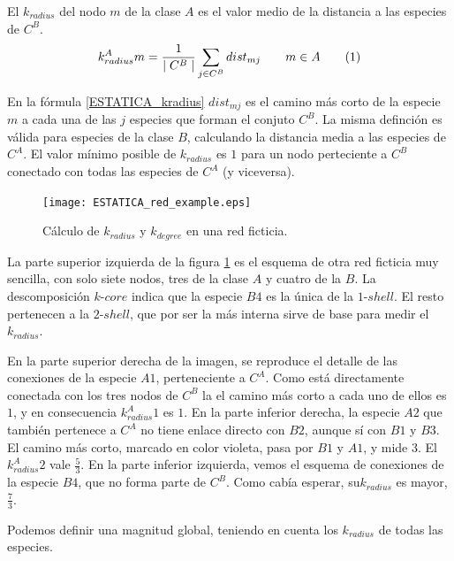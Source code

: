 \begin{theo} 
El \textit{$k_{radius}$} del nodo $m$ de la clase $A$ es el valor medio de la distancia a las especies de $C^B$.
\begin{align*}
\displaystyle
k^A_{radius}m = \frac{1}{\mid C^{B} \mid}\sum\limits_{j \in C^{B}} dist_{mj}  \qquad   m \in A
\stepcounter{equation}\tag{\theequation}\label{kradius}
\end{align*}
\label{ESTATICA_kradius}
\end{theo}

En la fórmula \ref{ESTATICA_kradius} $dist_{mj}$ es el camino más corto de la especie $m$ a cada una de las $j$ especies que forman el conjuto $C^B$. La misma definción es válida para especies de la clase $B$, calculando la distancia media a las especies de $C^A$. El valor mínimo posible de $k_{radius}$ es $1$ para un nodo perteciente a $C^B$ conectado con todas las especies de $C^A$ (y viceversa).

\begin{figure}[h!]
\centering
\texttt{[image: ESTATICA\_red\_example.eps]}
\caption {Cálculo de \textit{$k_{radius}$} y  \textit{$k_{degree}$} en una red ficticia.}
\label{fig:ESTATICA_red_example}
\end{figure}

La parte superior izquierda de la figura \ref{fig:ESTATICA_red_example} es el esquema de otra red ficticia muy sencilla, con solo siete nodos, tres de la clase $A$ y cuatro de la $B$. La descomposición $k$-$core$ indica que la especie $B4$ es la única de la $1$-$shell$. El resto pertenecen a la $2$-$shell$, que por ser la más interna sirve de base para medir el $k_{radius}$. 

En la parte superior derecha de la imagen, se reproduce el detalle de las conexiones de la especie $A1$, perteneciente a $C^{A}$.  Como está directamente conectada con los tres nodos de $C^{B}$ la el camino más corto a cada uno de ellos es $1$, y en consecuencia $k^A_{radius}1$ es $1$. En la parte inferior derecha, la especie $A2$ que también pertenece a $C^{A}$ no tiene enlace directo con $B2$, aunque sí con $B1$ y $B3$. El camino más corto, marcado en color violeta, pasa por $B1$ y $A1$, y mide $3$. El $k^A_{radius}2$ vale $\frac{5}{3}$. En la parte inferior izquierda, vemos el esquema de conexiones de la especie $B4$, que no forma parte de $C^{B}$. Como cabía esperar, su$k_{radius}$ es mayor, $\frac{7}{3}$. 

Podemos definir una magnitud global, teniendo en cuenta los $k_{radius}$ de todas las especies.

